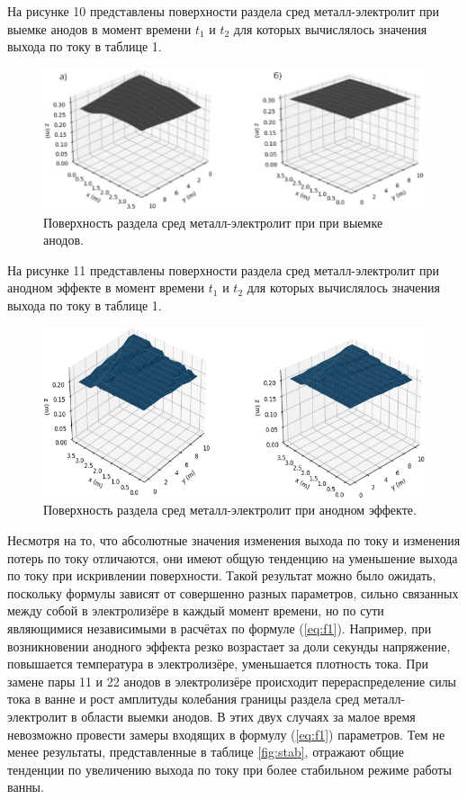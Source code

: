 \documentclass[]{pmi}
\begin{document}
На рисунке 10 представлены поверхности раздела сред металл-электролит при выемке анодов в момент времени $t_1$ и $t_2$ для которых вычислялось значения выхода по току в таблице 1.

\begin{figure}[H]
    \centering
    \includegraphics[width=150mm]{Выемка анодов поверхность.png}
    \caption{Поверхность раздела сред металл-электролит при при выемке анодов.}
    \label{fig:viemkaanod} 
\end{figure}

На рисунке 11 представлены поверхности раздела сред металл-электролит при анодном эффекте в момент времени $t_1$ и $t_2$ для которых вычислялось значения выхода по току в таблице 1.

\begin{figure}[H]
    \centering
    \includegraphics[width=150mm]{Анодный эффект поверхность.png}
    \caption{Поверхность раздела сред металл-электролит при анодном эффекте.}
    \label{fig:anodeffect}
\end{figure}

Несмотря на то, что абсолютные значения изменения выхода по току и изменения потерь по току отличаются, они имеют общую тенденцию на уменьшение выхода по току при искривлении поверхности. Такой результат можно было ожидать, поскольку формулы зависят от совершенно разных параметров, сильно связанных между собой в электролизёре в каждый момент времени, но по сути являющимися независимыми в расчётах по формуле (\ref{eq:f1}). Например, при возникновении анодного эффекта резко возрастает за доли секунды напряжение, повышается температура в электролизёре, уменьшается плотность тока. При замене пары 11 и 22 анодов в электролизёре происходит перераспределение силы тока в ванне и рост амплитуды колебания границы раздела сред металл-электролит в области выемки анодов. В этих двух случаях за малое время невозможно провести замеры входящих в формулу (\ref{eq:f1}) параметров. Тем не менее результаты, представленные в таблице \ref{fig:stab}, отражают общие тенденции по увеличению выхода по току при более стабильном режиме работы ванны.
\end{document}
